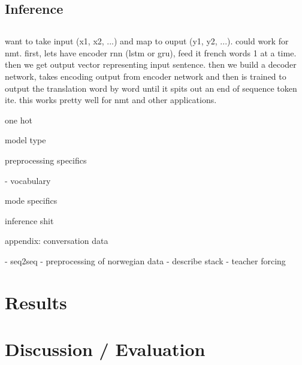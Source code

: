 \documentclass{article}
\begin{document}
\subsection{Inference}

\subsection{}

want to take input (x1, x2, ...) and map to ouput (y1, y2, ...). could work for nmt. first, lets have encoder rnn (lstm or gru),
feed it french words 1 at a time. then we get output vector representing input sentence. then we build a decoder network,
takes encoding output from encoder network and then is trained to output the translation word by word until it spits out an end of sequence token
 ite. this works pretty well for nmt and other applications. 



one hot

model type

preprocessing specifics

- vocabulary

mode specifics

inference shit


appendix: conversation data


\if
- seq2seq 
- preprocessing of norwegian data - describe stack 
- teacher forcing
\fi


\section{Results}


\section{Discussion / Evaluation}
\end{document}
